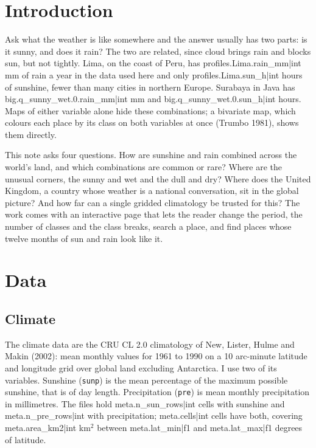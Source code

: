 \documentclass[11pt,a4paper]{article}
\begin{document}
\section{Introduction}

Ask what the weather is like somewhere and the answer usually has two parts: is it sunny, and does it rain? The two are related, since cloud brings rain and blocks sun, but not tightly. Lima, on the coast of Peru, has {{profiles.Lima.rain_mm|int}} mm of rain a year in the data used here and only {{profiles.Lima.sun_h|int}} hours of sunshine, fewer than many cities in northern Europe. Surabaya in Java has {{big.q_sunny_wet.0.rain_mm|int}} mm and {{big.q_sunny_wet.0.sun_h|int}} hours. Maps of either variable alone hide these combinations; a bivariate map, which colours each place by its class on both variables at once (Trumbo 1981), shows them directly.

This note asks four questions. How are sunshine and rain combined across the world's land, and which combinations are common or rare? Where are the unusual corners, the sunny and wet and the dull and dry? Where does the United Kingdom, a country whose weather is a national conversation, sit in the global picture? And how far can a single gridded climatology be trusted for this? The work comes with an interactive page that lets the reader change the period, the number of classes and the class breaks, search a place, and find places whose twelve months of sun and rain look like it.

\section{Data}

\subsection{Climate}

The climate data are the CRU CL 2.0 climatology of New, Lister, Hulme and Makin (2002): mean monthly values for 1961 to 1990 on a 10 arc-minute latitude and longitude grid over global land excluding Antarctica. I use two of its variables. Sunshine (\texttt{sunp}) is the mean percentage of the maximum possible sunshine, that is of day length. Precipitation (\texttt{pre}) is mean monthly precipitation in millimetres. The files hold {{meta.n_sun_rows|int}} cells with sunshine and {{meta.n_pre_rows|int}} with precipitation; {{meta.cells|int}} cells have both, covering {{meta.area_km2|int}} km$^2$ between {{meta.lat_min|f1}} and {{meta.lat_max|f1}} degrees of latitude.
\end{document}
